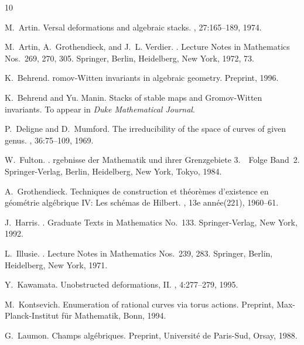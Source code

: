\documentclass[11pt]{article}
\theoremstyle{plain}
\theoremstyle{definition}
\theoremstyle{plain}
\theoremstyle{definition}
\theoremstyle{remark}
\begin{document}
\begin{thebibliography}{10}

M.~Artin.
\newblock Versal deformations and algebraic stacks.
, 27:165--189, 1974.

M.~Artin, A.~Grothendieck, and J.~L. Verdier.
.
\newblock Lecture Notes in Mathematics Nos.\ 269, 270, 305. Springer, Berlin,
  Heidelberg, New York, 1972, 73.

K.~Behrend.
romov-{W}itten invariants in algebraic geometry.
\newblock Preprint, 1996.

K.~Behrend and Yu. Manin.
\newblock Stacks of stable maps and {G}romov-{W}itten invariants.
\newblock To appear in {\em Duke Mathematical Journal}.

P.~Deligne and D.~Mumford.
\newblock The irreducibility of the space of curves of given genus.
, 36:75--109, 1969.

W.~Fulton.
.
rgebnisse der {M}athematik und ihrer {G}renzgebiete 3.\ ~Folge
  {B}and~2. Springer-Verlag, Berlin, Heidelberg, New York, Tokyo, 1984.

A.~Grothendieck.
\newblock Techniques de construction et th\'eor\`emes d'existence en
  g\'eom\'etrie alg\'ebrique {IV}: Les sch\'emas de {H}ilbert.
, 13e ann\'ee(221), 1960--61.

J.~Harris.
.
\newblock Graduate Texts in Mathematics No.\ 133. Springer-Verlag, New York,
  1992.

L.~Illusie.
.
\newblock Lecture Notes in Mathematics Nos.\ 239, 283. Springer, Berlin,
  Heidelberg, New York, 1971.

Y.~Kawamata.
\newblock Unobstructed deformations, {I}{I}.
, 4:277--279, 1995.

M.~Kontsevich.
\newblock Enumeration of rational curves via torus actions.
\newblock Preprint, Max-Planck-Institut f\"ur Mathematik, Bonn, 1994.

G.~Laumon.
\newblock Champs alg\'ebriques.
\newblock Preprint, Universit\'e de Paris-Sud, Orsay, 1988.


\end{thebibliography}
\end{document}
